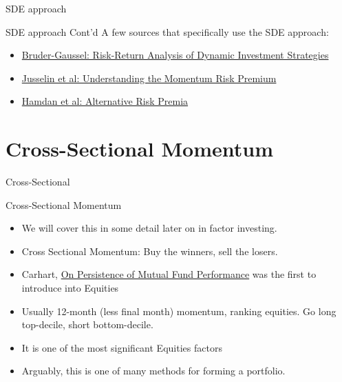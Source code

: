 \begin{frame}{SDE approach}
\begin{alertblock}{SDE approach Cont'd}
A few sources that specifically use the SDE approach:
\begin{itemize}
    \item \href{https://papers.ssrn.com/sol3/papers.cfm?abstract_id=2465623}{Bruder-Gaussel: Risk-Return Analysis of Dynamic Investment Strategies}
    \item \href{http://thierry-roncalli.com/download/Momentum_Risk_Premium.pdf  }{Jusselin et al: Understanding the Momentum  Risk Premium}
    \item \href{http://www.thierry-roncalli.com/download/Alternative_Risk_Premia.pdf}{Hamdan et al: Alternative Risk Premia}

\end{itemize}
\end{alertblock}
\end{frame}



\section{Cross-Sectional Momentum}
\begin{frame}{Cross-Sectional}
\begin{alertblock}{Cross-Sectional Momentum}
\begin{itemize}
    \item We will cover this in some detail later on in factor investing.
    \item Cross Sectional Momentum: Buy the winners, sell the losers. 
    \item Carhart, \href{https://onlinelibrary.wiley.com/doi/10.1111/j.1540-6261.1997.tb03808.x}{On Persistence of Mutual Fund Performance}  was the first to introduce into Equities 
    \item Usually 12-month (less final month) momentum, ranking equities. Go long top-decile, short bottom-decile. 
    \item It is one of the most significant Equities factors
    \item Arguably, this is one of many methods for forming a portfolio.
\end{itemize}
    
\end{alertblock}
    
\end{frame}


